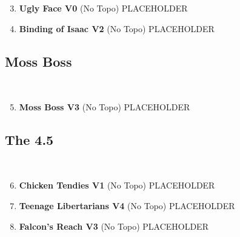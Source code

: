 \begin{multicols*}{2}
				\begin{enumerate}[]
					\setcounter{enumi}{2}
					\item\label{rt:Ugly Face} \colorbox{green!20}{\textbf{Ugly Face V0   \warn } }
						\newline (No Topo) 
					\newline PLACEHOLDER\
					\setcounter{enumi}{3}
					\item\label{rt:Binding of Isaac} \colorbox{green!20}{\textbf{Binding of Isaac V2    \warn } }
						\newline (No Topo) 
					\newline PLACEHOLDER\
				\end{enumerate}
			\subsection*{Moss Boss}\label{bf:Moss Boss}
			\
			
				\begin{enumerate}[]
					\setcounter{enumi}{4}
					\item\label{rt:Moss Boss} \colorbox{green!20}{\textbf{Moss Boss V3   } }
						\newline (No Topo) 
					\newline PLACEHOLDER\
				\end{enumerate}
			\subsection*{The 4.5}\label{bf:The 4.5}
			\
			
				\begin{enumerate}[]
					\setcounter{enumi}{5}
					\item\label{rt:Chicken Tendies} \colorbox{green!20}{\textbf{Chicken Tendies V1   } }
						\newline (No Topo) 
					\newline PLACEHOLDER\
					\setcounter{enumi}{6}
					\item\label{rt:Teenage Libertarians} \colorbox{RoyalBlue!20}{\textbf{Teenage Libertarians V4     } }
						\newline (No Topo) 
					\newline PLACEHOLDER\
					\setcounter{enumi}{7}
					\item\label{rt:Falcon's Reach} \colorbox{green!20}{\textbf{Falcon's Reach V3   } }
						\newline (No Topo) 
					\newline PLACEHOLDER\
				\end{enumerate}

\end{multicols*}
